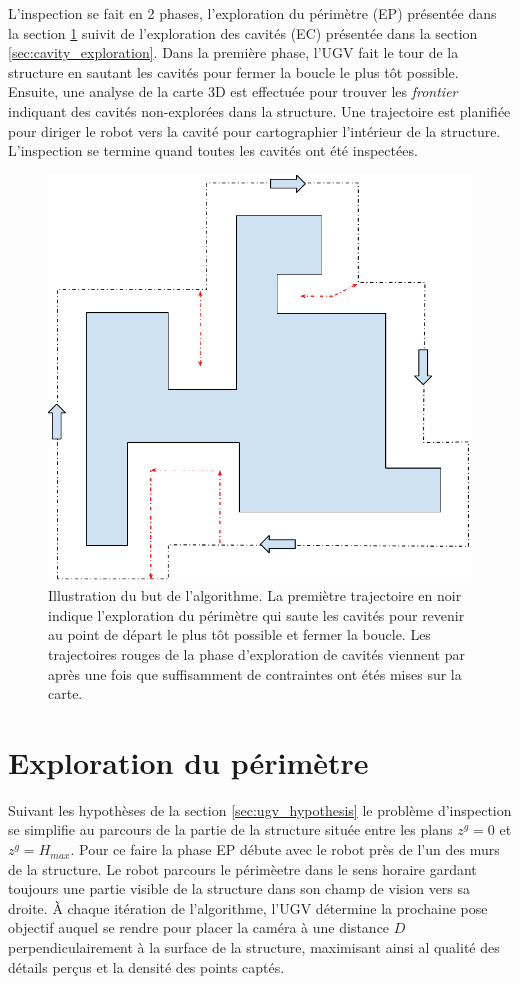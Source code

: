 L'inspection se fait en 2 phases, l'exploration du périmètre (EP) présentée dans la section \ref{sec:perimeter_exploration} suivit de l'exploration des cavités (EC) présentée dans la section \ref{sec:cavity_exploration}. Dans la première phase, l'UGV fait le tour de la structure en sautant les cavités pour fermer la boucle le plus tôt possible. Ensuite, une analyse de la carte 3D est effectuée pour trouver les \textit{frontier} indiquant des cavités non-explorées dans la structure. Une trajectoire est planifiée pour diriger le robot vers la cavité pour cartographier l'intérieur de la structure. L'inspection se termine quand toutes les cavités ont été inspectées.

\begin{figure}[ht]
  \centering
  \includegraphics[width=0.5\linewidth]{images/ugv_goal}
  \caption{Illustration du but de l'algorithme. La premiètre trajectoire en noir indique l'exploration du périmètre qui saute les cavités pour revenir au point de départ le plus tôt possible et fermer la boucle. Les trajectoires rouges de la phase d'exploration de cavités viennent par après une fois que suffisamment de contraintes ont étés mises sur la carte.}
  \label{fig:ugv_overview}
\end{figure}

\section{Exploration du périmètre} \label{sec:perimeter_exploration}

Suivant les hypothèses de la section \ref{sec:ugv_hypothesis} le problème d'inspection se simplifie au parcours de la partie de la structure située entre les plans $z^g = 0$ et $z^g = H_{max}$. Pour ce faire la phase EP débute avec le robot près de l'un des murs de la structure. Le robot parcours le périmèetre dans le sens horaire gardant toujours une partie visible de la structure dans son champ de vision vers sa droite. À chaque itération de l'algorithme, l'UGV détermine la prochaine pose objectif auquel se rendre pour placer la caméra à une distance $D$ perpendiculairement à la surface de la structure, maximisant ainsi al qualité des détails perçus et la densité des points captés.

